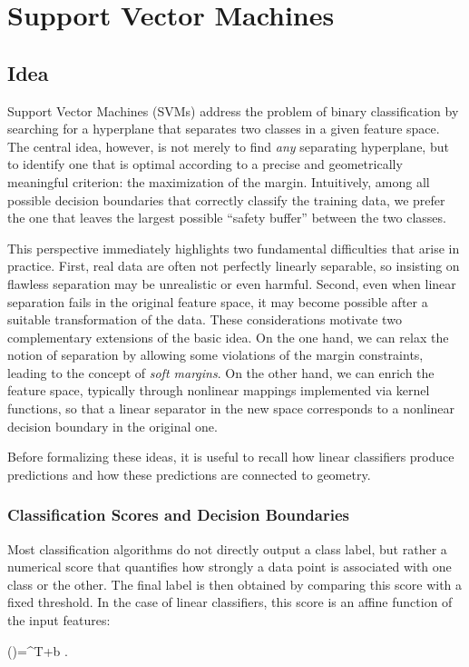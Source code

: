 
\chapter{Support Vector Machines}

\section*{Idea}

Support Vector Machines (SVMs) address the problem of binary classification by searching for a hyperplane that separates two classes in a given feature space. The central idea, however, is not merely to find \emph{any} separating hyperplane, but to identify one that is optimal according to a precise and geometrically meaningful criterion: the maximization of the margin. Intuitively, among all possible decision boundaries that correctly classify the training data, we prefer the one that leaves the largest possible ``safety buffer'' between the two classes.

This perspective immediately highlights two fundamental difficulties that arise in practice. First, real data are often not perfectly linearly separable, so insisting on flawless separation may be unrealistic or even harmful. Second, even when linear separation fails in the original feature space, it may become possible after a suitable transformation of the data. These considerations motivate two complementary extensions of the basic idea. On the one hand, we can relax the notion of separation by allowing some violations of the margin constraints, leading to the concept of \emph{soft margins}. On the other hand, we can enrich the feature space, typically through nonlinear mappings implemented via kernel functions, so that a linear separator in the new space corresponds to a nonlinear decision boundary in the original one.

Before formalizing these ideas, it is useful to recall how linear classifiers produce predictions and how these predictions are connected to geometry.

\subsection*{Classification Scores and Decision Boundaries}

Most classification algorithms do not directly output a class label, but rather a numerical score that quantifies how strongly a data point is associated with one class or the other. The final label is then obtained by comparing this score with a fixed threshold. In the case of linear classifiers, this score is an affine function of the input features:
\begin{myequation*}
(\x)=\w^T\x+b .
\end{myequation*}


